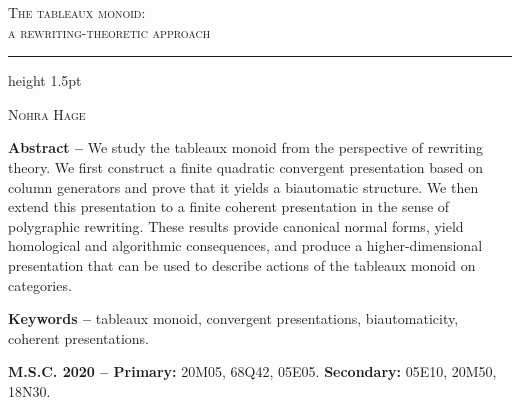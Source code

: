 \documentclass[a4paper, twoside, 11pt, english]{article}
\begin{document}
\thispagestyle{empty}

\begin{center}

\begin{doublespace}
\begin{huge}
{\scshape The tableaux monoid:\\  a rewriting-theoretic approach}
\end{huge}

\bigskip
\hrule height 1.5pt 
\bigskip

\begin{Large}
{\scshape Nohra Hage }
\end{Large}

\vspace{0.5cm} 

\end{doublespace}


\vspace{1cm} 

\begin{small}\begin{minipage}{14cm}
\noindent\textbf{Abstract -- } 
We study the tableaux monoid from the perspective of rewriting theory.
We first construct a finite quadratic convergent presentation based on column generators and prove that it yields a biautomatic structure.
We then extend this presentation to a finite coherent presentation in the sense of polygraphic rewriting.
These results provide canonical normal forms, yield homological and algorithmic consequences, and produce a higher-dimensional presentation that can be used to describe actions of the tableaux monoid on categories.
\medskip

\smallskip\noindent\textbf{Keywords --} tableaux monoid, convergent presentations, biautomaticity, coherent presentations. 
\medskip

\smallskip\noindent\textbf{M.S.C. 2020 -- Primary:} 20M05, 68Q42, 05E05. \textbf{Secondary:} 05E10, 20M50, 18N30.
\end{minipage}\end{small}




\begin{small}\begin{minipage}{12cm}
\renewcommand{\contentsname}{}
\setcounter{tocdepth}{1}
\tableofcontents
\end{minipage}
\end{small}
\end{center}
\end{document}
